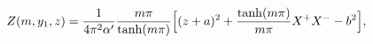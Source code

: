 \begin{equation}
  Z(m,y_1,z) = \frac{1}{4\pi^2\alpha'}\frac{m\pi}{\tanh(m\pi)} \Bigl[
      (z+ a)^2 +\frac{\tanh(m\pi)}{m\pi}X^+X^-- b^2 \Bigr],
\end{equation}

